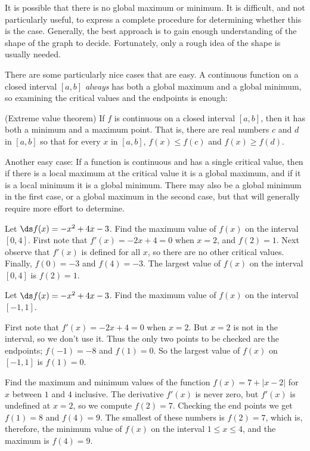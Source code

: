It is possible that there is no global maximum or minimum. It is
difficult, and not particularly useful, to express a complete procedure for
determining whether this is the case. Generally, the best approach is
to gain enough understanding of the shape of the graph to
decide. Fortunately, only a rough idea of the shape is usually needed.

There are some particularly nice cases that are easy. A
continuous function on a closed interval $[a,b]$ {\it
  always\/} has both a global maximum and a global minimum, so examining
the critical values and the endpoints is enough:

\begin{theorem} (Extreme value theorem) 
\label{thm:evt}
If $f$ is continuous on a closed interval
$[a,b]$, then it has both a minimum and a maximum point. That is,
there are real numbers $c$ and $d$ in $[a,b]$ so that 
for every $x$ in $[a,b]$, $f(x)\le f(c)$ and $f(x)\ge f(d)$.
\end{theorem}

Another easy case: If a function is
continuous and has a single critical value, then if there is a local
maximum at the critical value it is a global maximum, and if it is a
local minimum it is a global minimum. There may also be a global
minimum in the first case, or a global maximum in the second case, but
that will generally require more effort to determine.

\begin{example}
 Let $\ds f(x)=-x^2+4x-3$. 
Find the maximum value of $f(x)$ on the interval $[0,4]$.
First note that $f'(x)= -2 x +4=0$ when $x=2$, and $f(2)= 1$.
Next observe that $f'(x)$ is defined for all $x$, so there are no
other critical values.
Finally, $f(0) = -3$ and $f(4)= -3$. The largest value of
$f(x)$ on the interval $[0,4]$ is $f(2)=1$.
\end{example}

\begin{example}
Let $\ds f(x)=-x^2+4x-3$. Find the maximum value of $f(x)$ on the interval
$[-1,1]$.

First note that $f'(x)= -2 x +4=0$ when $x=2$. But $x=2$ is not in the
interval, so we don't use it.
Thus the only two points to be checked are the endpoints;
$f(-1) = -8$ and $f(1)= 0$. So the largest value of
$f(x)$ on $[-1,1]$ is $f(1)=0$.
\end{example}

\begin{example}
Find the maximum and minimum values of the function $f(x)= 7+|x-2|$ for
$x$ between $1$ and $4$ inclusive.
The derivative $f'(x)$ is never zero, but $f'(x)$ is undefined at $x=2$,
so we compute $f(2)= 7$. Checking the end points we get $f(1)=8$ and
$f(4)=9$. The smallest of these numbers is $f(2)=7$, which is, therefore,
the minimum value of $f(x)$ on the interval $1 \le x \le 4$, and the
maximum is $f(4)=9$.
\end{example}

